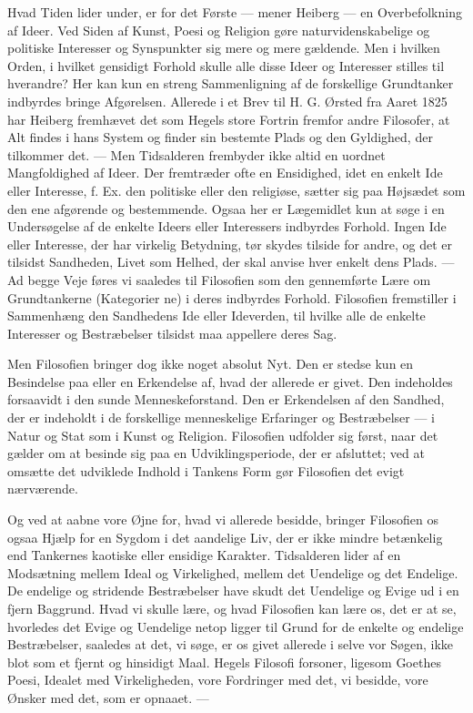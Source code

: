 \documentclass[12pt,a4paper,openany]{book}
\newcommand{\opage}[1]{\marginnote{\footnotesize\textit{[#1]}}}
\begin{document}
Hvad Tiden lider under, er for det Første --- mener Heiberg --- en
Overbefolkning af Ideer. Ved Siden af Kunst, Poesi og Religion gøre
naturvidenskabelige og politiske Interesser og Synspunkter sig mere og mere
gældende. Men i hvilken Orden, i hvilket gensidigt Forhold skulle alle disse
Ideer og Interesser stilles til hverandre? Her kan kun en streng Sammenligning
af de forskellige Grundtanker indbyrdes bringe Afgørelsen. Allerede i et Brev
til H. G. Ørsted fra Aaret 1825 har Heiberg fremhævet det som Hegels store
Fortrin fremfor andre Filosofer, at Alt findes i hans System og finder sin
bestemte Plads og den Gyldighed, der tilkommer det. --- Men Tidsalderen
frembyder ikke altid en uordnet Mangfoldighed af Ideer. Der fremtræder ofte en
Ensidighed, idet en enkelt Ide eller Interesse, f. Ex. den politiske eller den
religiøse, sætter sig paa Højsædet som den ene afgørende og bestemmende. Ogsaa
her er Lægemidlet kun at søge i en Undersøgelse af de enkelte Ideers eller
Interessers indbyrdes Forhold. Ingen Ide eller Interesse, der har virkelig
Betydning, tør skydes tilside for andre, og det er tilsidst Sandheden, Livet
som Helhed, der skal anvise hver enkelt dens Plads. --- Ad begge Veje føres vi
saaledes til Filosofien som den gennemførte Lære om Grundtankerne (Kategorier%
\setcounter{footnote}{0}%
\opage{131}ne) i deres indbyrdes Forhold. Filosofien fremstiller i Sammenhæng
den Sandhedens Ide eller Ideverden, til hvilke alle de enkelte Interesser og
Bestræbelser tilsidst maa appellere deres Sag.

Men Filosofien bringer dog ikke noget absolut Nyt. Den er stedse kun en
Besindelse paa eller en Erkendelse af, hvad der allerede er givet. Den
indeholdes forsaavidt i den sunde Menneskeforstand. Den er Erkendelsen af den
Sandhed, der er indeholdt i de forskellige menneskelige Erfaringer og
Bestræbelser --- i Natur og Stat som i Kunst og Religion. Filosofien udfolder
sig først, naar det gælder om at besinde sig paa en Udviklingsperiode, der er
afsluttet; ved at omsætte det udviklede Indhold i Tankens Form gør Filosofien
det evigt nærværende.

Og ved at aabne vore Øjne for, hvad vi allerede besidde, bringer Filosofien os
ogsaa Hjælp for en Sygdom i det aandelige Liv, der er ikke mindre betænkelig
end Tankernes kaotiske eller ensidige Karakter. Tidsalderen lider af en
Modsætning mellem Ideal og Virkelighed, mellem det Uendelige og det Endelige.
De endelige og stridende Bestræbelser have skudt det Uendelige og Evige ud i en
fjern Baggrund. Hvad vi skulle lære, og hvad Filosofien kan lære os, det er at
se, hvorledes det Evige og Uendelige netop ligger til Grund for de enkelte og
endelige Bestræbelser, saaledes at det, vi søge, er os givet allerede i selve
vor Søgen, ikke blot som et fjernt og hinsidigt Maal. Hegels Filosofi forsoner,
ligesom Goethes Poesi, Idealet med Virkeligheden, vore Fordringer med det, vi
besidde, vore Ønsker med det, som er opnaaet. ---
\end{document}
